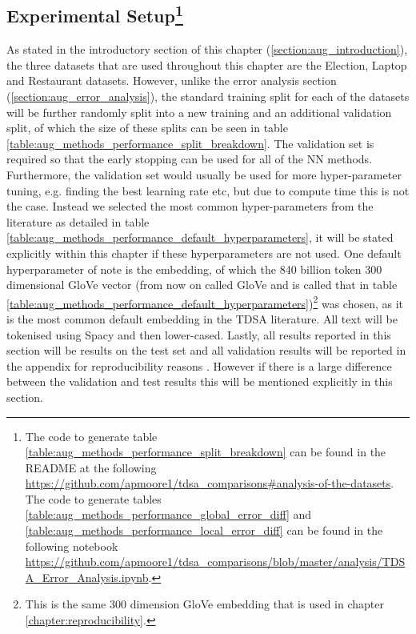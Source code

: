 \subsection[Experimental Setup]{Experimental Setup\footnote{The code to generate table \ref{table:aug_methods_performance_split_breakdown} can be found in the README at the following \url{https://github.com/apmoore1/tdsa_comparisons\#analysis-of-the-datasets}. The code to generate tables \ref{table:aug_methods_performance_global_error_diff} and \ref{table:aug_methods_performance_local_error_diff} can be found in the following notebook \url{https://github.com/apmoore1/tdsa_comparisons/blob/master/analysis/TDSA_Error_Analysis.ipynb}.}}
\label{section:aug_experimental_setup}
As stated in the introductory section of this chapter (\ref{section:aug_introduction}), the three datasets that are used throughout this chapter are the Election, Laptop and Restaurant datasets. However, unlike the error analysis section (\ref{section:aug_error_analysis}), the standard training split for each of the datasets will be further randomly split into a new training and an additional validation split, of which the size of these splits can be seen in table \ref{table:aug_methods_performance_split_breakdown}. The validation set is required so that the early stopping can be used for all of the NN methods. Furthermore, the validation set would usually be used for more hyper-parameter tuning, e.g. finding the best learning rate etc, but due to compute time this is not the case. Instead we selected the most common hyper-parameters from the literature as detailed in table \ref{table:aug_methods_performance_default_hyperparameters}, it will be stated explicitly within this chapter if these hyperparameters are not used. One default hyperparameter of note is the embedding, of which the 840 billion token 300 dimensional GloVe vector \citep{pennington-etal-2014-glove} (from now on called GloVe and is called that in table \ref{table:aug_methods_performance_default_hyperparameters})\footnote{This is the same 300 dimension GloVe embedding that is used in chapter \ref{chapter:reproducibility}.} was chosen, as it is the most common default embedding in the TDSA literature. All text will be tokenised using Spacy and then lower-cased. Lastly, all results reported in this section will be results on the test set and all validation results will be reported in the appendix for reproducibility reasons \citep{dodge-etal-2019-show}. However if there is a large difference between the validation and test results this will be mentioned explicitly in this section.

